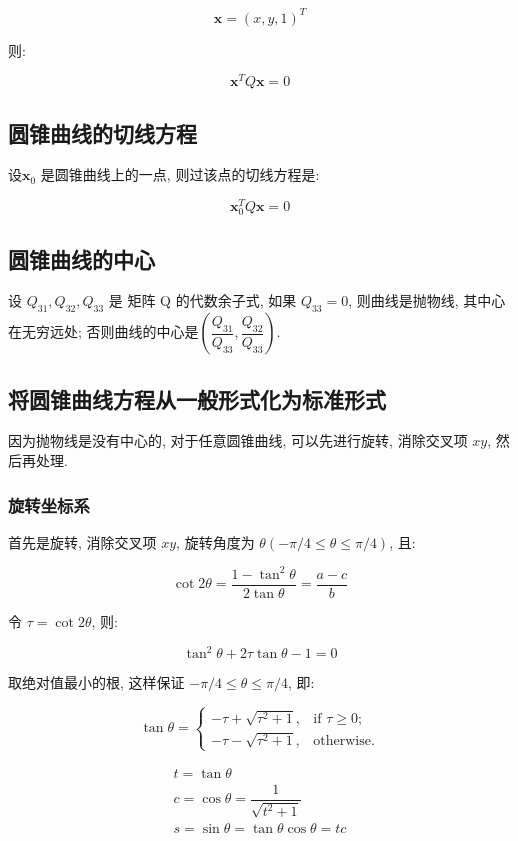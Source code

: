 \[
  \mathbf{x} = (x,y,1)^T
\]

则:

\[
  \mathbf{x}^T Q \mathbf{x} = 0
\]

\subsection{圆锥曲线的切线方程}

设$\mathbf{x}_0$ 是圆锥曲线上的一点, 则过该点的切线方程是:

\[
  \mathbf{x}_0^T Q \mathbf{x} = 0
\]

\subsection{圆锥曲线的中心}

设 $Q_{31},Q_{32},Q_{33}$ 是 矩阵 Q 的代数余子式, 如果 $Q_{33} = 0$, 则曲线是抛物线, 其中心在无穷远处;
否则曲线的中心是$\left(\dfrac{Q_{31}}{Q_{33}}, \dfrac{Q_{32}}{Q_{33}}\right)$.


\subsection{将圆锥曲线方程从一般形式化为标准形式}

因为抛物线是没有中心的, 对于任意圆锥曲线, 可以先进行旋转, 消除交叉项 $xy$, 然后再处理.

\subsubsection{旋转坐标系}

首先是旋转, 消除交叉项 $xy$, 旋转角度为 $\theta(-\pi/4 \leq \theta \leq \pi/4)$, 且:

\[
  \cot2\theta = \dfrac{1-\tan^2\theta}{2\tan\theta} = \dfrac{a-c}{b}
\]

令 $\tau = \cot2\theta$, 则:

\[
  \tan^2\theta + 2\tau \tan\theta -1 = 0
\]

取绝对值最小的根, 这样保证 $-\pi/4 \leq \theta \leq \pi/4$, 即:

\[
  \tan\theta = \begin{cases}
    - \tau + \sqrt{\tau^2+1}, & \text{if } \tau \geq 0;\\
    - \tau - \sqrt{\tau^2+1}, & \text{otherwise}.
  \end{cases}
\]

\begin{gather*}
  t = \tan\theta\\
  c = \cos\theta = \dfrac{1}{\sqrt{t^2+1}}\\
  s = \sin\theta = \tan\theta \cos\theta = tc
\end{gather*}

